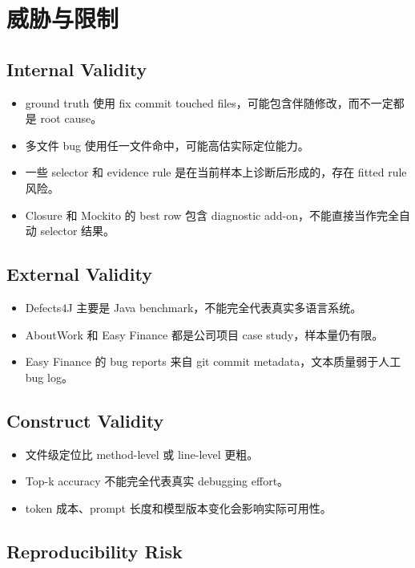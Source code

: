 \documentclass[12pt,a4paper]{ctexart}
\begin{document}
\section{威胁与限制}

\subsection{Internal Validity}

\begin{itemize}
  \item ground truth 使用 fix commit touched files，可能包含伴随修改，而不一定都是 root cause。
  \item 多文件 bug 使用任一文件命中，可能高估实际定位能力。
  \item 一些 selector 和 evidence rule 是在当前样本上诊断后形成的，存在 fitted rule 风险。
  \item Closure 和 Mockito 的 best row 包含 diagnostic add-on，不能直接当作完全自动 selector 结果。
\end{itemize}

\subsection{External Validity}

\begin{itemize}
  \item Defects4J 主要是 Java benchmark，不能完全代表真实多语言系统。
  \item AboutWork 和 Easy Finance 都是公司项目 case study，样本量仍有限。
  \item Easy Finance 的 bug reports 来自 git commit metadata，文本质量弱于人工 bug log。
\end{itemize}

\subsection{Construct Validity}

\begin{itemize}
  \item 文件级定位比 method-level 或 line-level 更粗。
  \item Top-k accuracy 不能完全代表真实 debugging effort。
  \item token 成本、prompt 长度和模型版本变化会影响实际可用性。
\end{itemize}

\subsection{Reproducibility Risk}
\end{document}
